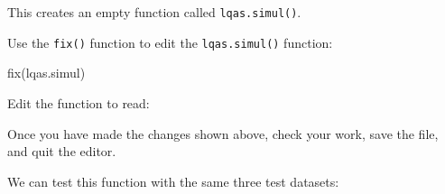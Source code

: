 \documentclass[
  12pt,
  a4paper]{book}
\newenvironment{Shaded}{\begin{snugshade}}{\end{snugshade}}
\newcommand{\AttributeTok}[1]{\textcolor[rgb]{0.77,0.63,0.00}{#1}}
\newcommand{\ControlFlowTok}[1]{\textcolor[rgb]{0.13,0.29,0.53}{\textbf{#1}}}
\newcommand{\DecValTok}[1]{\textcolor[rgb]{0.00,0.00,0.81}{#1}}
\newcommand{\FunctionTok}[1]{\textcolor[rgb]{0.00,0.00,0.00}{#1}}
\newcommand{\NormalTok}[1]{#1}
\newcommand{\OtherTok}[1]{\textcolor[rgb]{0.56,0.35,0.01}{#1}}
\newcommand{\SpecialCharTok}[1]{\textcolor[rgb]{0.00,0.00,0.00}{#1}}
\begin{document}
This creates an empty function called \texttt{lqas.simul()}.

Use the \texttt{fix()} function to edit the \texttt{lqas.simul()} function:

\begin{Shaded}
\begin{Highlighting}[]
\FunctionTok{fix}\NormalTok{(lqas.simul)}
\end{Highlighting}
\end{Shaded}

Edit the function to read:

\begin{Shaded}
\end{Shaded}

Once you have made the changes shown above, check your work, save the file, and quit the editor.

We can test this function with the same three test datasets:
\end{document}
